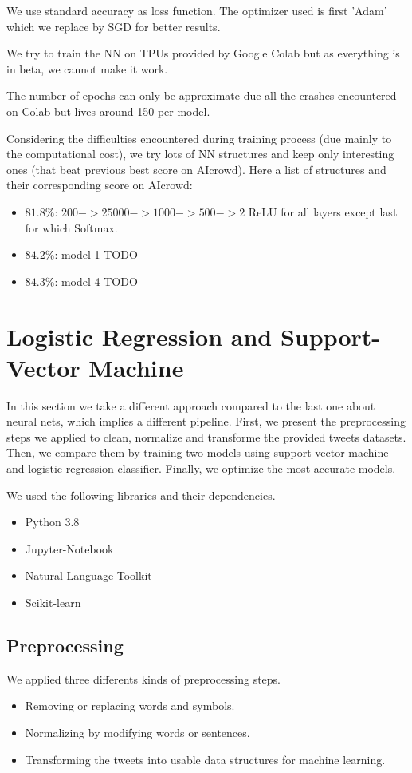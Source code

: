 \documentclass[11pt, a4paper, twocolumn]{article}
\begin{document}
We use standard accuracy as loss function. The optimizer used is first 'Adam' which we replace by SGD for better results.

We try to train the NN on TPUs provided by Google Colab but as everything is in beta, we cannot make it work.

The number of epochs can only be approximate due all the crashes encountered on Colab but lives around 150 per model.

Considering the difficulties encountered during training process (due mainly to the computational cost), we try lots of NN 
structures and keep only interesting ones (that beat previous best score on AIcrowd). 
Here a list of structures and their corresponding score on AIcrowd:
\begin{itemize}
  \item \textbf{$81.8\%$}: $200->25000->1000->500->2$ ReLU for all layers except last for which Softmax.
  \item \textbf{$84.2\%$}: model-1 TODO
  \item \textbf{$84.3\%$}: model-4 TODO
\end{itemize}
\section{Logistic Regression and Support-Vector Machine}
In this section we take a different approach compared to the last one about neural nets, which implies a different pipeline. First, we present the preprocessing steps we applied to clean, normalize and transforme the provided tweets datasets. Then, we compare them by training two models using support-vector machine and logistic regression classifier. Finally, we optimize the most accurate models.

We used the following libraries and their dependencies.
\begin{itemize}
	\item Python 3.8
	\item Jupyter-Notebook
	\item Natural Language Toolkit
	\item Scikit-learn
\end{itemize}

\subsection{Preprocessing}
We applied three differents kinds of preprocessing steps.
\begin{itemize}
	\item Removing or replacing words and symbols.
	\item Normalizing by modifying words or sentences.
	\item Transforming the tweets into usable data structures for machine learning.
\end{itemize}
\end{document}
